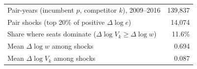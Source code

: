 \begin{tabular}{lr}
\toprule
Pair-years (incumbent \(p\), competitor \(k\)), 2009--2016 &   139,837 \\
Pair shocks (top 20\% of positive \(\Delta\log e\)) &    14,074 \\
Share where seats dominate (\(\Delta\log V_k \ge \Delta\log w\)) &  11.6\% \\
Mean \(\Delta\log w\) among shocks &  0.694 \\
Mean \(\Delta\log V_k\) among shocks &  0.087 \\
\bottomrule
\end{tabular}
